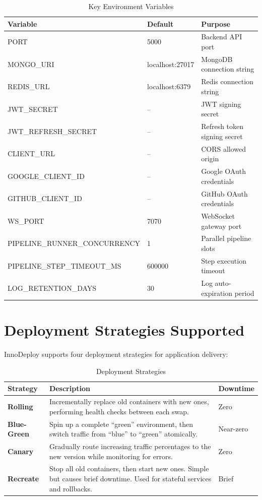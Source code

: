 \documentclass[12pt,a4paper,twoside]{report}
\begin{document}
\begin{table}[H]
\centering
\caption{Key Environment Variables}
\label{tab:env-vars}
\begin{tabularx}{\textwidth}{l|l|X}
\toprule
\textbf{Variable} & \textbf{Default} & \textbf{Purpose} \\
\midrule
PORT & 5000 & Backend API port \\
MONGO\_URI & localhost:27017 & MongoDB connection string \\
REDIS\_URL & localhost:6379 & Redis connection string \\
JWT\_SECRET & -- & JWT signing secret \\
JWT\_REFRESH\_SECRET & -- & Refresh token signing secret \\
CLIENT\_URL & -- & CORS allowed origin \\
GOOGLE\_CLIENT\_ID & -- & Google OAuth credentials \\
GITHUB\_CLIENT\_ID & -- & GitHub OAuth credentials \\
WS\_PORT & 7070 & WebSocket gateway port \\
PIPELINE\_RUNNER\_CONCURRENCY & 1 & Parallel pipeline slots \\
PIPELINE\_STEP\_TIMEOUT\_MS & 600000 & Step execution timeout \\
LOG\_RETENTION\_DAYS & 30 & Log auto-expiration period \\
\bottomrule
\end{tabularx}
\end{table}

\section{Deployment Strategies Supported}

InnoDeploy supports four deployment strategies for application delivery:

\begin{table}[H]
\centering
\caption{Deployment Strategies}
\label{tab:deploy-strategies}
\begin{tabularx}{\textwidth}{l|X|l}
\toprule
\textbf{Strategy} & \textbf{Description} & \textbf{Downtime} \\
\midrule
\textbf{Rolling} & Incrementally replace old containers with new ones, performing health checks between each swap. & Zero \\
\textbf{Blue-Green} & Spin up a complete ``green'' environment, then switch traffic from ``blue'' to ``green'' atomically. & Near-zero \\
\textbf{Canary} & Gradually route increasing traffic percentages to the new version while monitoring for errors. & Zero \\
\textbf{Recreate} & Stop all old containers, then start new ones. Simple but causes brief downtime. Used for stateful services and rollbacks. & Brief \\
\bottomrule
\end{tabularx}
\end{table}
\end{document}
